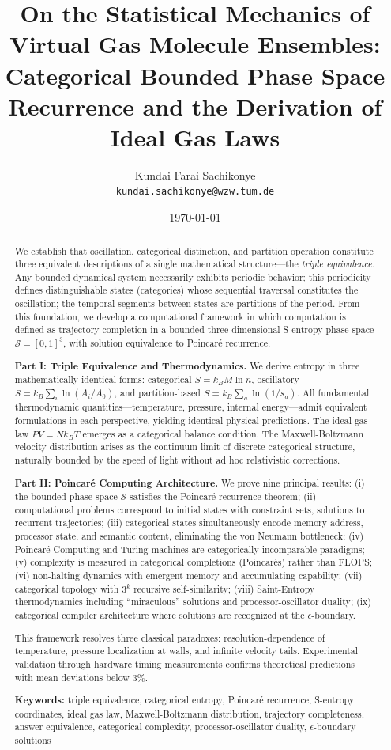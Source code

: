 \documentclass[twocolumn,10pt]{article}
\title{\textbf{On the Statistical Mechanics of Virtual Gas Molecule Ensembles: \\
Categorical Bounded Phase Space Recurrence and the Derivation of Ideal Gas Laws}}
\author{
Kundai Farai Sachikonye\\
\texttt{kundai.sachikonye@wzw.tum.de}
}
\date{\today}
\theoremstyle{plain}
\theoremstyle{definition}
\theoremstyle{remark}
\newcommand{\Sspace}{\mathcal{S}}
\begin{document}
\maketitle

\begin{abstract}
We establish that oscillation, categorical distinction, and partition operation constitute three equivalent descriptions of a single mathematical structure---the \textit{triple equivalence}. Any bounded dynamical system necessarily exhibits periodic behavior; this periodicity defines distinguishable states (categories) whose sequential traversal constitutes the oscillation; the temporal segments between states are partitions of the period. From this foundation, we develop a computational framework in which computation is defined as trajectory completion in a bounded three-dimensional S-entropy phase space $\Sspace = [0,1]^3$, with solution equivalence to Poincar\'e recurrence.

\textbf{Part I: Triple Equivalence and Thermodynamics.} We derive entropy in three mathematically identical forms: categorical $S = k_B M \ln n$, oscillatory $S = k_B \sum_i \ln(A_i/A_0)$, and partition-based $S = k_B \sum_a \ln(1/s_a)$. All fundamental thermodynamic quantities---temperature, pressure, internal energy---admit equivalent formulations in each perspective, yielding identical physical predictions. The ideal gas law $PV = Nk_BT$ emerges as a categorical balance condition. The Maxwell-Boltzmann velocity distribution arises as the continuum limit of discrete categorical structure, naturally bounded by the speed of light without ad hoc relativistic corrections.

\textbf{Part II: Poincar\'e Computing Architecture.} We prove nine principal results: (i) the bounded phase space $\Sspace$ satisfies the Poincar\'e recurrence theorem; (ii) computational problems correspond to initial states with constraint sets, solutions to recurrent trajectories; (iii) categorical states simultaneously encode memory address, processor state, and semantic content, eliminating the von Neumann bottleneck; (iv) Poincar\'e Computing and Turing machines are categorically incomparable paradigms; (v) complexity is measured in categorical completions (Poincar\'es) rather than FLOPS; (vi) non-halting dynamics with emergent memory and accumulating capability; (vii) categorical topology with $3^k$ recursive self-similarity; (viii) Saint-Entropy thermodynamics including ``miraculous'' solutions and processor-oscillator duality; (ix) categorical compiler architecture where solutions are recognized at the $\epsilon$-boundary.

This framework resolves three classical paradoxes: resolution-dependence of temperature, pressure localization at walls, and infinite velocity tails. Experimental validation through hardware timing measurements confirms theoretical predictions with mean deviations below 3\%.

\textbf{Keywords:} triple equivalence, categorical entropy, Poincar\'e recurrence, S-entropy coordinates, ideal gas law, Maxwell-Boltzmann distribution, trajectory completeness, answer equivalence, categorical complexity, processor-oscillator duality, $\epsilon$-boundary solutions
\end{abstract}
\end{document}
